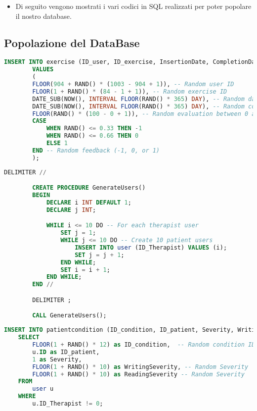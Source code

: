 \documentclass{article}
\begin{document}
    \begin{itemize}
        \item Di seguito vengono mostrati i vari codici in SQL realizzati per poter popolare il nostro database.
    \end{itemize}


    \pagebreak

    \subsection{Popolazione del DataBase}

\begin{lstlisting}[language=SQL, caption=Generazione Casuale esecuzione esercizio]
    INSERT INTO exercise (ID_user, ID_exercise, InsertionDate, CompletionDate, Evaluation, Feedback)
        VALUES
        (
        FLOOR(904 + RAND() * (1003 - 904 + 1)), -- Random user ID
        FLOOR(1 + RAND() * (84 - 1 + 1)), -- Random exercise ID
        DATE_SUB(NOW(), INTERVAL FLOOR(RAND() * 365) DAY), -- Random date
        DATE_SUB(NOW(), INTERVAL FLOOR(RAND() * 365) DAY), -- Random completion date
        FLOOR(RAND() * (100 - 0 + 1)), -- Random evaluation between 0 and 100
        CASE
            WHEN RAND() <= 0.33 THEN -1
            WHEN RAND() <= 0.66 THEN 0
            ELSE 1
        END -- Random feedback (-1, 0, or 1)
        );
    \end{lstlisting}

    \begin{lstlisting}[language=SQL, caption=Generazione degli utenti]
        DELIMITER //

        CREATE PROCEDURE GenerateUsers()
        BEGIN
            DECLARE i INT DEFAULT 1;
            DECLARE j INT;

            WHILE i <= 10 DO -- For each therapist user
                SET j = 1;
                WHILE j <= 10 DO -- Create 10 patient users
                    INSERT INTO user (ID_Therapist) VALUES (i);
                    SET j = j + 1;
                END WHILE;
                SET i = i + 1;
            END WHILE;
        END //

        DELIMITER ;

        CALL GenerateUsers();
    \end{lstlisting}

    \pagebreak

\begin{lstlisting}[language=SQL, caption=Generazione delle Writing e Reading severity (tutti i pazienti)]
    INSERT INTO patientcondition (ID_condition, ID_patient, Severity, WritingSeverity, ReadingSeverity)
    SELECT
        FLOOR(1 + RAND() * 12) as ID_condition,  -- Random condition ID (1 to 12)
        u.ID as ID_patient,
        1 as Severity,
        FLOOR(1 + RAND() * 10) as WritingSeverity, -- Random Severity
        FLOOR(1 + RAND() * 10) as ReadingSeverity -- Random Severity
    FROM
        user u
    WHERE
        u.ID_Therapist != 0;
\end{lstlisting}
\end{document}
